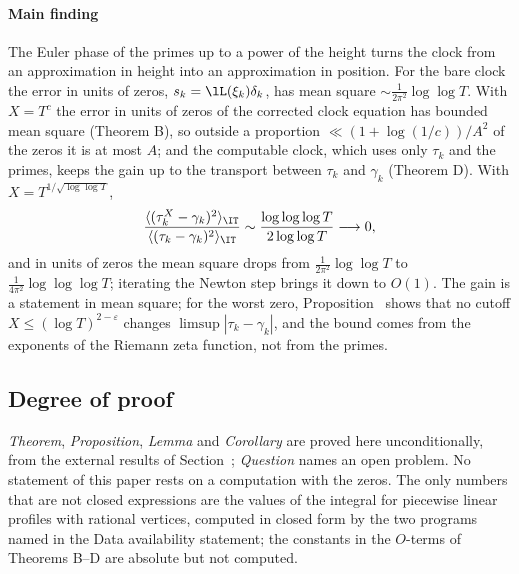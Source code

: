\paragraph{Main finding} The Euler phase of the primes up to a power of the height turns the clock from an approximation in height into an approximation in position. For the bare clock the error in units of zeros, $s_k=\lL(\xi_k)\delta_k$, has mean square $\sim\frac1{2\pi^2}\log\log T$. With $X=T^c$ the error in units of zeros of the corrected clock equation has bounded mean square (Theorem B), so outside a proportion $\ll(1+\log(1/c))/A^2$ of the zeros it is at most $A$; and the computable clock, which uses only $\tau_k$ and the primes, keeps the gain up to the transport between $\tau_k$ and $\gamma_k$ (Theorem D). With $X=T^{1/\sqrt{\log\log T}}$,
\begin{equation}
\frac{\langle(\tau_k^X-\gamma_k)^2\rangle_{\IT}}{\langle(\tau_k-\gamma_k)^2\rangle_{\IT}}\sim\frac{\log\log\log T}{2\log\log T}\longrightarrow0,
\label{eq:intro_ratio}
\end{equation}
and in units of zeros the mean square drops from $\frac1{2\pi^2}\log\log T$ to $\frac1{4\pi^2}\log\log\log T$; iterating the Newton step brings it down to $O(1)$. The gain is a statement in mean square; for the worst zero, Proposition~ shows that no cutoff $X\le(\log T)^{2-\varepsilon}$ changes $\limsup|\tau_k-\gamma_k|$, and the bound  comes from the exponents of the Riemann zeta function, not from the primes.

\subsection{Degree of proof}
\label{subsec:status}
\emph{Theorem}, \emph{Proposition}, \emph{Lemma} and \emph{Corollary} are proved here unconditionally, from the external results of Section~; \emph{Question} names an open problem. No statement of this paper rests on a computation with the zeros. The only numbers that are not closed expressions are the values of the integral  for piecewise linear profiles with rational vertices, computed in closed form by the two programs named in the Data availability statement; the constants in the $O$-terms of Theorems B--D are absolute but not computed.

